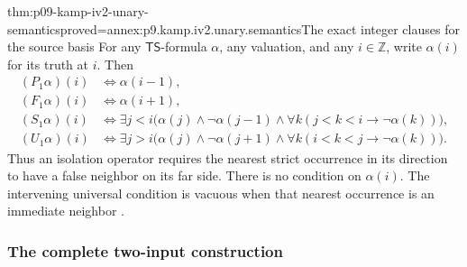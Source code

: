\begin{hblemma}{thm:p09-kamp-iv2-unary-semantics}{proved=annex:p9.kamp.iv2.unary.semantics}{The exact integer clauses for the source basis}
For any \(\mathsf{TS}\)-formula \(\alpha\), any valuation,
and any \(i\in\mathbb Z\), write \(\alpha(i)\) for its
truth at \(i\). Then
\[
\begin{aligned}
 (P_1\alpha)(i)&\Longleftrightarrow\alpha(i-1),\\
 (F_1\alpha)(i)&\Longleftrightarrow\alpha(i+1),\\
 (S_1\alpha)(i)&\Longleftrightarrow
   \exists j<i\bigl(\alpha(j)\land\neg\alpha(j-1)\land
       \forall k(j<k<i\to\neg\alpha(k))\bigr),\\
 (U_1\alpha)(i)&\Longleftrightarrow
   \exists j>i\bigl(\alpha(j)\land\neg\alpha(j+1)\land
       \forall k(i<k<j\to\neg\alpha(k))\bigr).
\end{aligned}
\]
Thus an isolation operator requires the nearest strict occurrence
in its direction to have a false neighbor on its far side.
There is no condition on \(\alpha(i)\). The intervening
universal condition is vacuous when that nearest occurrence is an
immediate neighbor
\cite[ch.~IV, pp.~101--102]{Kamp1968}.
\end{hblemma}

\subsubsection{The complete two-input construction}

